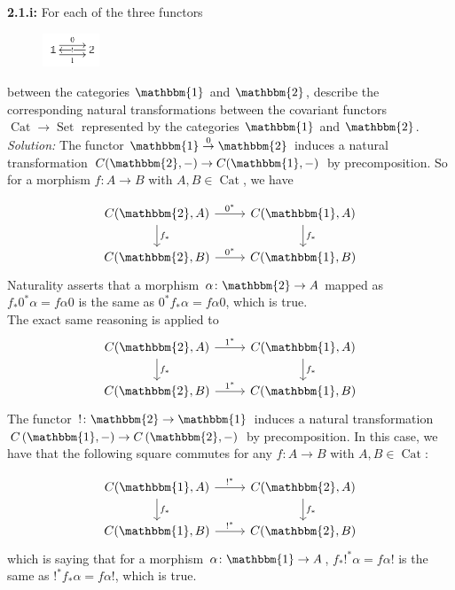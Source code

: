 \documentclass[a4paper]{article}
\DeclareMathOperator{\Set}{Set}
\DeclareMathOperator{\Cat}{Cat}
\begin{document}
    \textbf{2.1.i:} For each of the three functors
    \begin{figure}[H]
        \centering
        \includegraphics[width=0.15\textwidth]{1.png}
        \label{fig:1-png}
    \end{figure}
    between the categories $\mathbbm{1}$ and $\mathbbm{2}$, describe the
    corresponding natural transformations between the covariant functors
    $\Cat \to \Set$ represented by the categories $\mathbbm{1}$ and
    $\mathbbm{2}$.\\
    \linebreak
    \textit{Solution:} The functor $\mathbbm{1} \stackrel{0}{\to} \mathbbm{2}$ 
    induces a natural transformation $C(\mathbbm{2}, -) \to C(\mathbbm{1}, -)$ by
    precomposition. So for a morphism
    $f  \colon A \to B$ with $A,B \in \Cat$, we have


    \[
    \begin{tikzcd}
        C(\mathbbm{2},A) \arrow[r, "0^*"] \arrow[d, "f_*"] & C(\mathbbm{1}, A)
        \arrow[d, "f_{*}"] \\
        C(\mathbbm{2}, B) \arrow[r, "0^*"] & C(\mathbbm{1},B)
    \end{tikzcd}
    \] 
Naturality asserts that a morphism $\alpha  \colon \mathbbm{2} \to A$ mapped
as $f_* 0^{*} \alpha = f \alpha 0$ is the same as
$0^{*} f_* \alpha = f \alpha 0$, which is true.\\
\linebreak
The exact same reasoning is applied to
    \[
    \begin{tikzcd}
        C(\mathbbm{2},A) \arrow[r, "1^*"] \arrow[d, "f_*"] & C(\mathbbm{1}, A)
        \arrow[d, "f_{*}"] \\
        C(\mathbbm{2}, B) \arrow[r, "1^*"] & C(\mathbbm{1},B)
    \end{tikzcd}
    \] 
    The functor
$!  \colon \mathbbm{2} \to \mathbbm{1}$ induces a natural transformation
$C \left( \mathbbm{1}, - \right) \to C\left( \mathbbm{2},- \right) $ by
precomposition.
In this case, we have that the following square commutes for any
$f  \colon A \to B$ with $A, B \in \Cat$:

\begin{equation*}
\begin{tikzcd}
    C(\mathbbm{1}, A) \arrow[r, "!^{*}"] \arrow[d, "f_*"] & C(\mathbbm{2}, A)
    \arrow[d, "f_*"]\\
    C(\mathbbm{1},B) \arrow[r, "!^{*}"] & C(\mathbbm{2}, B)
\end{tikzcd}
\end{equation*}
which is saying that
for a morphism $\alpha  \colon \mathbbm{1} \to A$,
$f_* !^{*} \alpha = f \alpha !$ is the same as
$!^{*} f_* \alpha = f \alpha !$, which is true.
\end{document}
